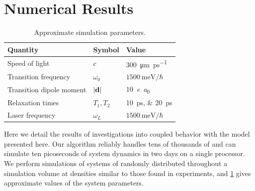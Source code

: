\section{\label{section:results}Numerical Results}
\begin{table}
  \begin{ruledtabular}
    \begin{tabular}{lll}
      Quantity                 & Symbol         & Value                        \\ \hline
      Speed of light           & $c$            & \SI{300}{\micro\meter \per \pico\second} \\
      Transition frequency     & $\omega_0$     & $\SI{1500}{\milli\eV}/\hbar$ \\
      Transition dipole moment & $\abs{\vb{d}}$ & \SI{10}{\elementarycharge\bohr} \\
      Relaxation times         & $T_{1}, T_{2}$ & \SIlist{10;20}{\pico\second} \\
      Laser frequency          & $\omega_L$     & $\SI{1500}{\milli\eV}/\hbar$ \\
    \end{tabular}
  \end{ruledtabular}
  \caption{\label{table:parameters}Approximate simulation parameters.}
\end{table}

Here we detail the results of investigations into coupled \qd{} behavior with the model presented here.
Our algorithm reliably handles tens of thousands of \qds{} and can simulate ten picoseconds of system dynamics in two days on a single processor.
We perform simulations of systems of \qds{} randomly distributed throughout a simulation volume at densities similar to those found in experiments, and \cref{table:parameters} gives approximate values of the system parameters.

